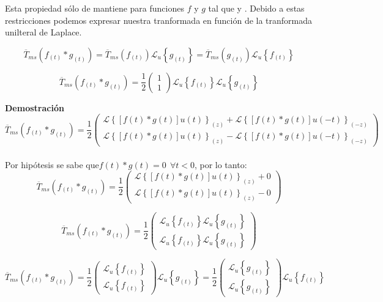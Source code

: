 \documentclass[12pt]{article}
\begin{document}
Esta propiedad sólo de mantiene para funciones $f$ y $g$ tal que   y  . Debido a estas restricciones podemos expresar nuestra tranformada en función de la tranformada unilteral de Laplace.

\begin{equation}\overline{T}_{ms}(f_{(t)} * g_{(t)}) = 
 \overline{T}_{ms}(f_{(t)})\mathcal{L}_u\left\{g_{(t)} \right\} = 
 \overline{T}_{ms}(g_{(t)}) \mathcal{L}_u\left\{f_{(t)} \right\} 
\end{equation}

$$
\overline{T}_{ms}(f_{(t)} * g_{(t)})=\frac12 \begin{pmatrix}
1\\1
\end{pmatrix}\mathcal{L}_u\left\{f_{(t)} \right\}\mathcal{L}_u\left\{g_{(t)} \right\}
$$


{\bfseries Demostración}
$$
\overline{T}_{ms}(f_{(t)} * g_{(t)}) = 
\frac12
\begin{pmatrix}
\mathcal{L}\left\{\left[f(t)*g(t)\right]u(t)\right\}_{(z)} +  \mathcal{L}\left\{\left[f(t)*g(t)\right]u(-t)\right\}_{(-z)}\\[0.2 cm]
\mathcal{L}\left\{\left[f(t)*g(t)\right]u(t)\right\}_{(z)} -  \mathcal{L}\left\{\left[f(t)*g(t)\right]u(-t)\right\}_{(-z)} 
\end{pmatrix}
$$\\

Por hipótesis se sabe que$f(t)*g(t) = 0 \ \ \forall t < 0 $, por lo tanto:
$$
\overline{T}_{ms}(f_{(t)} * g_{(t)}) = 
\frac12
\begin{pmatrix}
\mathcal{L}\left\{\left[f(t)*g(t)\right]u(t)\right\}_{(z)} + 0\\[0.2 cm]
\mathcal{L}\left\{\left[f(t)*g(t)\right]u(t)\right\}_{(z)} -  0 
\end{pmatrix}
$$


$$
\overline{T}_{ms}(f_{(t)} * g_{(t)}) = \frac12
\begin{pmatrix}
\mathcal{L}_u\left\{f_{(t)}\right\}  \mathcal{L}_u\left\{g_{(t)} \right\}\\[0.2 cm]
\mathcal{L}_u\left\{f_{(t)}\right\} \mathcal{L}_u\left\{g_{(t)}\right\}
\end{pmatrix}
$$

$$
\overline{T}_{ms}(f_{(t)} * g_{(t)}) = \frac12
\begin{pmatrix}
\mathcal{L}_u\left\{f_{(t)}\right\} \\[0.2 cm]
\mathcal{L}_u\left\{f_{(t)}\right\}
\end{pmatrix} \mathcal{L}_u\left\{g_{(t)} \right\} = \frac12
\begin{pmatrix}
\mathcal{L}_u\left\{g_{(t)}\right\} \\[0.2 cm]
\mathcal{L}_u\left\{g_{(t)}\right\}
\end{pmatrix} \mathcal{L}_u\left\{f_{(t)} \right\}
$$
\end{document}
